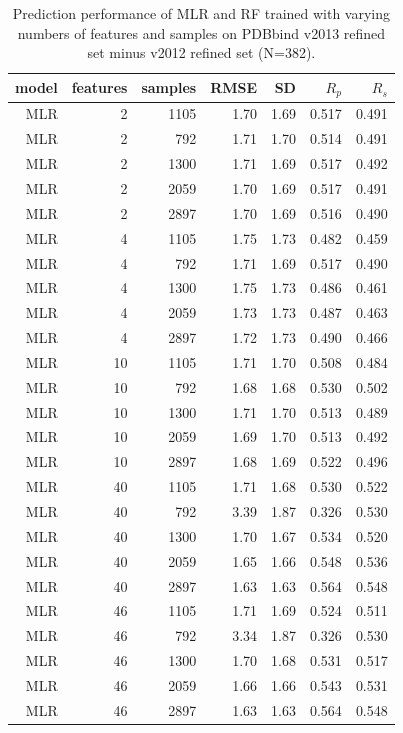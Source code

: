 \documentclass[journal=jacsat,manuscript=article]{achemso}
\begin{document}
\begin{table}
\caption{Prediction performance of MLR and RF trained with varying numbers of features and samples on PDBbind v2013 refined set minus v2012 refined set (N=382).}
\label{tbl:tst382}
\begin{tabular}{rrrrrrr}
\hline
model & features & samples & RMSE & SD & $R_p$ & $R_s$\\
\hline
MLR &  2 & 1105 & 1.70 & 1.69 & 0.517 & 0.491\\
MLR &  2 &  792 & 1.71 & 1.70 & 0.514 & 0.491\\
MLR &  2 & 1300 & 1.71 & 1.69 & 0.517 & 0.492\\
MLR &  2 & 2059 & 1.70 & 1.69 & 0.517 & 0.491\\
MLR &  2 & 2897 & 1.70 & 1.69 & 0.516 & 0.490\\
MLR &  4 & 1105 & 1.75 & 1.73 & 0.482 & 0.459\\
MLR &  4 &  792 & 1.71 & 1.69 & 0.517 & 0.490\\
MLR &  4 & 1300 & 1.75 & 1.73 & 0.486 & 0.461\\
MLR &  4 & 2059 & 1.73 & 1.73 & 0.487 & 0.463\\
MLR &  4 & 2897 & 1.72 & 1.73 & 0.490 & 0.466\\
MLR & 10 & 1105 & 1.71 & 1.70 & 0.508 & 0.484\\
MLR & 10 &  792 & 1.68 & 1.68 & 0.530 & 0.502\\
MLR & 10 & 1300 & 1.71 & 1.70 & 0.513 & 0.489\\
MLR & 10 & 2059 & 1.69 & 1.70 & 0.513 & 0.492\\
MLR & 10 & 2897 & 1.68 & 1.69 & 0.522 & 0.496\\
MLR & 40 & 1105 & 1.71 & 1.68 & 0.530 & 0.522\\
MLR & 40 &  792 & 3.39 & 1.87 & 0.326 & 0.530\\
MLR & 40 & 1300 & 1.70 & 1.67 & 0.534 & 0.520\\
MLR & 40 & 2059 & 1.65 & 1.66 & 0.548 & 0.536\\
MLR & 40 & 2897 & 1.63 & 1.63 & 0.564 & 0.548\\
MLR & 46 & 1105 & 1.71 & 1.69 & 0.524 & 0.511\\
MLR & 46 &  792 & 3.34 & 1.87 & 0.326 & 0.530\\
MLR & 46 & 1300 & 1.70 & 1.68 & 0.531 & 0.517\\
MLR & 46 & 2059 & 1.66 & 1.66 & 0.543 & 0.531\\
MLR & 46 & 2897 & 1.63 & 1.63 & 0.564 & 0.548\\

\end{tabular}
\end{table}
\end{document}
